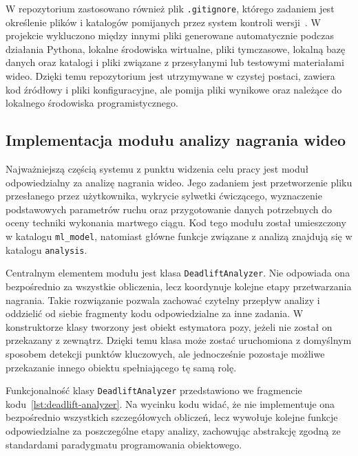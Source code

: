 W repozytorium zastosowano również plik \texttt{.gitignore}, którego zadaniem jest określenie plików i katalogów pomijanych przez system kontroli wersji~\cite{gitignore_docs}. W projekcie wykluczono między innymi pliki generowane automatycznie podczas działania Pythona, lokalne środowiska wirtualne, pliki tymczasowe, lokalną bazę danych oraz katalogi i pliki związane z przesyłanymi lub testowymi materiałami wideo. Dzięki temu repozytorium jest utrzymywane w czystej postaci, zawiera kod źródłowy i pliki konfiguracyjne, ale pomija pliki wynikowe oraz należące do lokalnego środowiska programistycznego.

\subsection{Implementacja modułu analizy nagrania wideo}

Najważniejszą częścią systemu z punktu widzenia celu pracy jest moduł odpowiedzialny za analizę nagrania wideo. Jego zadaniem jest przetworzenie pliku przesłanego przez użytkownika, wykrycie sylwetki ćwiczącego, wyznaczenie podstawowych parametrów ruchu oraz przygotowanie danych potrzebnych do oceny techniki wykonania martwego ciągu. Kod tego modułu został umieszczony w katalogu \texttt{ml\_model}, natomiast główne funkcje związane z analizą znajdują się w katalogu \texttt{analysis}.

Centralnym elementem modułu jest klasa \texttt{DeadliftAnalyzer}. Nie odpowiada ona bezpośrednio za wszystkie obliczenia, lecz koordynuje kolejne etapy przetwarzania nagrania. Takie rozwiązanie pozwala zachować czytelny przepływ analizy i oddzielić od siebie fragmenty kodu odpowiedzialne za inne zadania. W konstruktorze klasy tworzony jest obiekt estymatora pozy, jeżeli nie został on przekazany z zewnątrz. Dzięki temu klasa może zostać uruchomiona z domyślnym sposobem detekcji punktów kluczowych, ale jednocześnie pozostaje możliwe przekazanie innego obiektu spełniającego tę samą rolę.

Funkcjonalność klasy \texttt{DeadliftAnalyzer} przedstawiono we fragmencie kodu~\ref{lst:deadlift-analyzer}. Na wycinku kodu widać, że nie implementuje ona bezpośrednio wszystkich szczegółowych obliczeń, lecz wywołuje kolejne funkcje odpowiedzialne za poszczególne etapy analizy, zachowując abstrakcję zgodną ze standardami paradygmatu programowania obiektowego.

